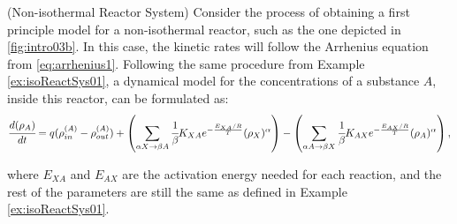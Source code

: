 \documentclass[a4paper,11pt]{book}
\numberwithin{figure}{chapter}
\numberwithin{equation}{chapter}
\numberwithin{table}{chapter}
\theoremstyle{definition}
\newtheorem{example}{Example}[chapter]
\newcounter{boxed-theorem}
\newcounter{boxed-definition}
\newcounter{boxed-example}
\newenvironment{boxed-example}[1]
{\colorlet{shadecolor}{pastelRed!20} \begin{shaded} \begin{example}{#1}}
{\end{example} \end{shaded}}
\begin{document}
\begin{boxed-example}{(Non-isothermal Reactor System)} \label{ex:exoReactSys01}
    Consider the process of obtaining a first principle model for a non-isothermal reactor, such as the one depicted in \ref{fig:intro03b}. In this case, the kinetic rates will follow the Arrhenius equation from \eqref{eq:arrhenius1}. Following the same procedure from Example \ref{ex:isoReactSys01}, a dynamical model for the concentrations of a substance $A$, inside this reactor, can be formulated as: 
    \begin{equation} \label{eq:exoModel1}
            \cfrac{d (\rho_A)}{dt} = q (\rho^{(A)}_{in} - \rho^{(A)}_{out}) + \left( \sum_{\alpha X \rightarrow \beta A} \cfrac{1}{\beta} K_{XA} e^{-\frac{E_{XA}/R}{T}} (\rho_X)^{\alpha} \right) - \left(\sum_{\alpha A \rightarrow \beta X} \cfrac{1}{\beta} K_{AX} e^{-\frac{E_{AX}/R}{T}} (\rho_A)^{\alpha} \right)
    ,\end{equation}

    \noindent where $E_{XA}$ and $E_{AX}$ are the activation energy needed for each reaction, and the rest of the parameters are still the same as defined in Example \ref{ex:isoReactSys01}.  
    

\end{boxed-example}
\end{document}
